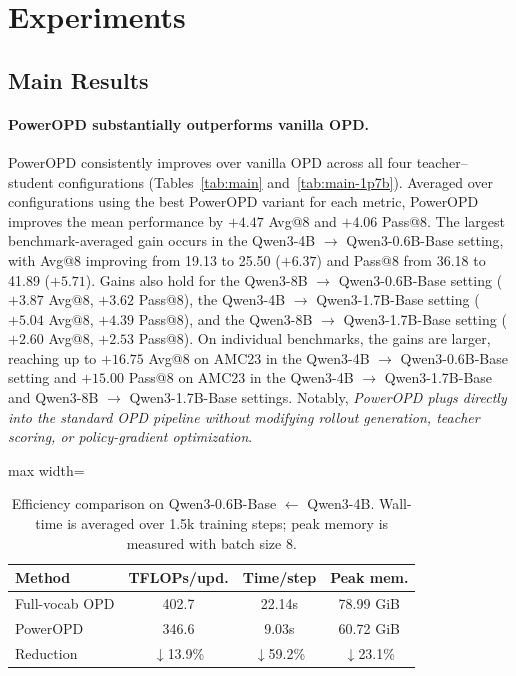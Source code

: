 \section{Experiments}
\label{sec:experiments}







\subsection{Main Results}
\label{sec:main-results}
 
\paragraph{PowerOPD substantially outperforms vanilla OPD.}
PowerOPD consistently improves over vanilla OPD across all four teacher--student configurations (Tables~\ref{tab:main} and~\ref{tab:main-1p7b}). Averaged over configurations using the best PowerOPD variant for each metric, PowerOPD improves the mean performance by \(\mathbf{+4.47}\) Avg@8 and \(\mathbf{+4.06}\) Pass@8. The largest benchmark-averaged gain occurs in the Qwen3-4B \(\to\) Qwen3-0.6B-Base setting, with Avg@8 improving from 19.13 to 25.50 (\(\mathbf{+6.37}\)) and Pass@8 from 36.18 to 41.89 (\(\mathbf{+5.71}\)). Gains also hold for the Qwen3-8B \(\to\) Qwen3-0.6B-Base setting (\(+3.87\) Avg@8, \(+3.62\) Pass@8), the Qwen3-4B \(\to\) Qwen3-1.7B-Base setting (\(+5.04\) Avg@8, \(+4.39\) Pass@8), and the Qwen3-8B \(\to\) Qwen3-1.7B-Base setting (\(+2.60\) Avg@8, \(+2.53\) Pass@8). On individual benchmarks, the gains are larger, reaching up to \(\mathbf{+16.75}\) Avg@8 on AMC23 in the Qwen3-4B \(\to\) Qwen3-0.6B-Base setting and \(\mathbf{+15.00}\) Pass@8 on AMC23 in the Qwen3-4B \(\to\) Qwen3-1.7B-Base and Qwen3-8B \(\to\) Qwen3-1.7B-Base settings. Notably, \emph{PowerOPD plugs directly into the standard OPD pipeline without modifying rollout generation, teacher scoring, or policy-gradient optimization}.

\begin{table}[t]
  \centering
  \footnotesize
  \setlength{\tabcolsep}{3pt}
  \begin{adjustbox}{max width=\columnwidth}
    \begin{tabular}{lccc}
    \toprule
    \textbf{Method} & \textbf{TFLOPs/upd.} & \textbf{Time/step} & \textbf{Peak mem.} \\
    \midrule
    Full-vocab OPD & 402.7 & 22.14s & 78.99 GiB \\
    PowerOPD & 346.6 & 9.03s & 60.72 GiB \\
    \midrule
    Reduction & $\downarrow$13.9\% & $\downarrow$59.2\% & $\downarrow$23.1\% \\
    \bottomrule
  \end{tabular}
  \end{adjustbox}
  \vspace{-5pt}
  \caption{Efficiency comparison on Qwen3-0.6B-Base $\leftarrow$ Qwen3-4B. Wall-time is averaged over 1.5k training steps; peak memory is measured with batch size 8.}
  \vspace{-12pt}
  \label{tab:efficiency}
\end{table}

